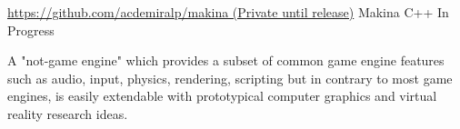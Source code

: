 \begin{cventries}
  \cventry
    {\href{https://github.com/acdemiralp/makina}{https://github.com/acdemiralp/makina (Private until release)}}
    {Makina}
    {C++}
    {In Progress}
    {
      \begin{cvitems}
        \item {A "not-game engine" which provides a subset of common game engine features such as audio, input, physics, rendering, scripting but in contrary to most game engines, is easily extendable with prototypical computer graphics and virtual reality research ideas.}
      \end{cvitems}
    }
    
\end{cventries}
